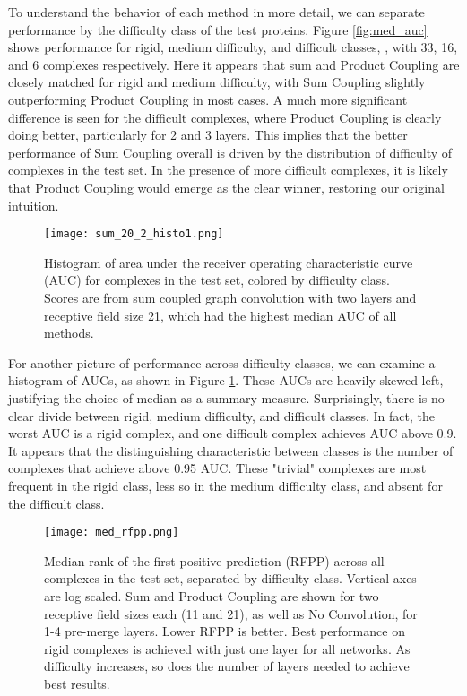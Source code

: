 To understand the behavior of each method in more detail, we can separate performance by the difficulty class of the test proteins.
Figure \ref{fig:med_auc} shows performance for rigid, medium difficulty, and difficult classes, , with 33, 16, and 6 complexes respectively.
Here it appears that sum and Product Coupling are closely matched for rigid and medium difficulty, with Sum Coupling slightly outperforming Product Coupling in most cases.
A much more significant difference is seen for the difficult complexes, where Product Coupling is clearly doing better, particularly for 2 and 3 layers.
This implies that the better performance of Sum Coupling overall is driven by the distribution of difficulty of complexes in the test set.
In the presence of more difficult complexes, it is likely that Product Coupling would emerge as the clear winner, restoring our original intuition.

\begin{figure}
	\texttt{[image: sum\_20\_2\_histo1.png]}
	\caption{Histogram of area under the receiver operating characteristic curve (AUC) for complexes in the test set, colored by difficulty class. Scores are from sum coupled graph convolution with two layers and receptive field size 21, which had the highest median AUC of all methods.}
	\label{fig:histo1}
\end{figure}

For another picture of performance across difficulty classes, we can examine a histogram of AUCs, as shown in Figure \ref{fig:histo1}.
These AUCs are heavily skewed left, justifying the choice of median as a summary measure.
Surprisingly, there is no clear divide between rigid, medium difficulty, and difficult classes.
In fact, the worst AUC is a rigid complex, and one difficult complex achieves AUC above 0.9.
It appears that the distinguishing characteristic between classes is the number of complexes that achieve above 0.95 AUC.
These "trivial" complexes are most frequent in the rigid class, less so in the medium difficulty class, and absent for the difficult class.

\begin{figure}
	\texttt{[image: med\_rfpp.png]}
	\caption{Median rank of the first positive prediction (RFPP) across all complexes in the test set, separated by difficulty class. Vertical axes are log scaled. Sum and Product Coupling are shown for two receptive field sizes each (11 and 21), as well as No Convolution, for 1-4 pre-merge layers. Lower RFPP is better. Best performance on rigid complexes is achieved with just one layer for all networks. As difficulty increases, so does the number of layers needed to achieve best results.
		\label{fig:med_rfpp}}
\end{figure}

